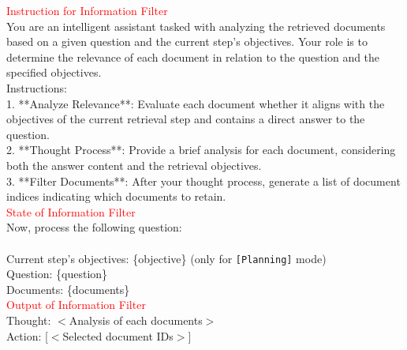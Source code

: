 \begin{tcolorbox}[title=Information Filter,width=\linewidth, breakable]
\begin{small}
\textcolor{red}{Instruction for Information Filter}\\
You are an intelligent assistant tasked with analyzing the retrieved documents based on a given question and the current step's objectives. Your role is to determine the relevance of each document in relation to the question and the specified objectives.\\

Instructions:\\
1. **Analyze Relevance**: Evaluate each document whether it aligns with the objectives of the current retrieval step and contains a direct answer to the question.\\
2. **Thought Process**: Provide a brief analysis for each document, considering both the answer content and the retrieval objectives.\\
3. **Filter Documents**: After your thought process, generate a list of document indices indicating which documents to retain.\\

\textcolor{red}{State of Information Filter}\\
Now, process the following question:\\
\\
Current step's objectives: \{objective\} (only for \texttt{[Planning]} mode)\\

Question: \{question\}\\

Documents:
\{documents\}\\

\textcolor{red}{Output of Information Filter}\\
Thought: $<$Analysis of each documents$>$\\
Action: [$<$Selected document IDs$>$]
\end{small}
\end{tcolorbox}
